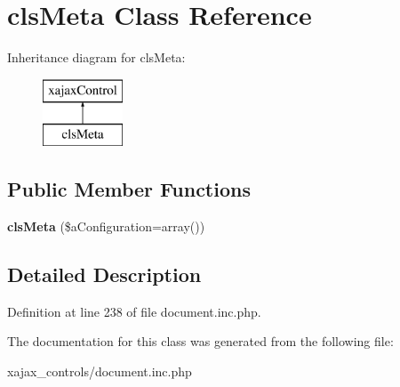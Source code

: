 \hypertarget{classclsMeta}{
\section{clsMeta Class Reference}
\label{classclsMeta}
}
Inheritance diagram for clsMeta:\begin{figure}[H]
\begin{center}
\leavevmode
\includegraphics[height=2.000000cm]{classclsMeta}
\end{center}
\end{figure}
\subsection*{Public Member Functions}
\begin{DoxyCompactItemize}
\item 
\hypertarget{classclsMeta_a1a28d98b3fa7a66aaa792ab884a4deea}{
{\bfseries clsMeta} (\$aConfiguration=array())}
\label{classclsMeta_a1a28d98b3fa7a66aaa792ab884a4deea}

\end{DoxyCompactItemize}


\subsection{Detailed Description}


Definition at line 238 of file document.inc.php.



The documentation for this class was generated from the following file:\begin{DoxyCompactItemize}
\item 
xajax\_\-controls/document.inc.php\end{DoxyCompactItemize}
